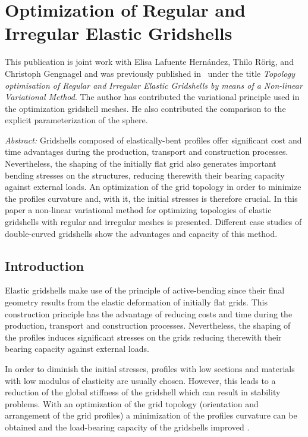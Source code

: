 \documentclass[Thesis.tex]{subfiles}
\begin{document}
\chapter{Optimization of Regular and Irregular Elastic Gridshells}
\label{chp:gridshells}

This publication is joint work with Elisa Lafuente Hern\'andez, Thilo R\"orig, and Christoph Gengnagel and was
previously published in~\cite{Lafuente2012} under the title \emph{Topology optimisation of Regular and Irregular Elastic Gridshells by means of a Non-linear Variational Method}. The author has contributed the variational principle used in the optimization gridshell meshes. He also contributed the comparison to the explicit parameterization of the sphere.

\emph{Abstract:}
Gridshells composed of elastically-bent profiles offer significant cost and time advantages during the production, transport and construction processes. Nevertheless, the shaping of the initially flat grid also generates important bending stresses on the structures, reducing therewith their bearing capacity against external loads. An optimization of the grid topology in order to minimize the profiles curvature and, with it, the initial stresses is therefore crucial. In this paper a non-linear variational method for optimizing topologies of elastic gridshells with regular and irregular meshes is presented. Different case studies of double-curved gridshells show the advantages and capacity of this method.

\section{Introduction}

Elastic gridshells make use of the principle of active-bending \cite{AlpermannLG2012} since their final geometry results from the elastic deformation of initially flat grids. This construction principle has the advantage of reducing costs and time during the production, transport and construction processes. Nevertheless, the shaping of the profiles induces significant stresses on the grids reducing therewith their bearing capacity against external loads.  

In order to diminish the initial stresses, profiles with low sections and materials with low modulus of elasticity are usually chosen. However, this leads to a reduction of the global stiffness of the gridshell which can result in stability problems. With an optimization of the grid topology (orientation and arrangement of the grid profiles) a minimization of the profiles curvature can be obtained and the load-bearing capacity of the gridshells improved \cite{Lafuente2011}.  
\end{document}

